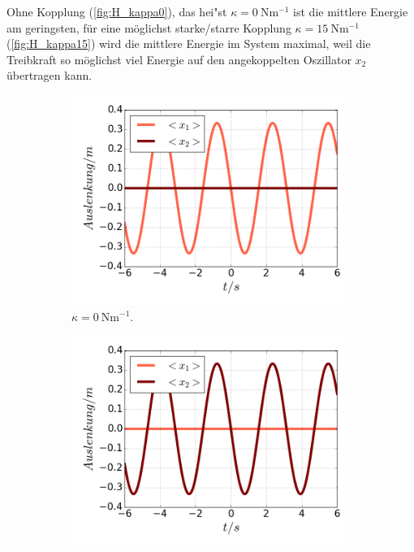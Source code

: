\fi
    Ohne Kopplung (\ref{fig:H_kappa0}), das hei"st $\kappa=\SI{0}{\newton \meter^{-1}}$ ist die mittlere Energie am geringsten, für eine möglichst starke/starre Kopplung $\kappa=\SI{15}{\newton \meter^{-1}}$ (\ref{fig:H_kappa15}) wird die mittlere Energie im System maximal, weil die Treibkraft so möglichst viel Energie auf den angekoppelten Oszillator $x_2$ übertragen kann.
    \begin{figure}
      \begin{subfigure}[t]{0.5\textwidth}
        \centering
        \includegraphics[width=\textwidth]{plots/<x2>nl0.png}
        \caption{$\kappa=\SI{0}{\newton \meter^{-1}}$.}
        \label{fig:x2_null}
      \end{subfigure}
      \begin{subfigure}[t]{0.5\textwidth}
          \centering
          \includegraphics[width=\textwidth]{plots/<x1>nl0.png}

\end{subfigure}
\end{figure}
